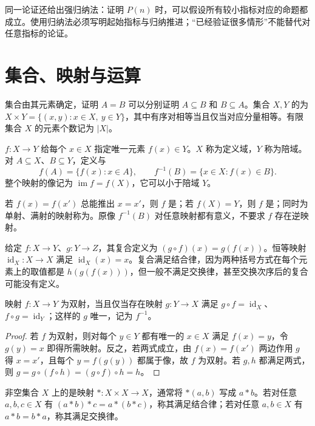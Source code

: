 \documentclass[UTF8,12pt,a4paper,fontset=fandol]{ctexbook}
\begin{document}
同一论证还给出强归纳法：证明 $P(n)$ 时，可以假设所有较小指标对应的命题都成立。使用归纳法必须写明起始指标与归纳推进；“已经验证很多情形”不能替代对任意指标的论证。

\section{集合、映射与运算}\label{sec:maps-operations}

集合由其元素确定，证明 $A=B$ 可以分别证明 $A\subseteq B$ 和 $B\subseteq A$。集合 $X,Y$ 的为 $X\times Y=\{(x,y):x\in X,\ y\in Y\}$，其中有序对相等当且仅当对应分量相等。有限集合 $X$ 的元素个数记为 $|X|$。

\begin{definition}[映射与像]
$f:X\to Y$ 给每个 $x\in X$ 指定唯一元素 $f(x)\in Y$。$X$ 称为定义域，$Y$ 称为陪域。对 $A\subseteq X$、$B\subseteq Y$，定义与
\[
  f(A)=\{f(x):x\in A\},\qquad
  f^{-1}(B)=\{x\in X:f(x)\in B\}.
\]
整个映射的像记为 $\operatorname{im}f=f(X)$，它可以小于陪域 $Y$。
\end{definition}

若 $f(x)=f(x')$ 总能推出 $x=x'$，则 $f$ 是；若 $f(X)=Y$，则 $f$ 是；同时为单射、满射的映射称为。原像 $f^{-1}(B)$ 对任意映射都有意义，不要求 $f$ 存在逆映射。

给定 $f:X\to Y$、$g:Y\to Z$，其复合定义为 $(g\circ f)(x)=g(f(x))$。恒等映射 $\operatorname{id}_X:X\to X$ 满足 $\operatorname{id}_X(x)=x$。复合满足结合律，因为两种括号方式在每个元素上的取值都是 $h(g(f(x)))$，但一般不满足交换律，甚至交换次序后的复合可能没有定义。

\begin{proposition}[双射与逆映射]\label{prop:inverse-map}
映射 $f:X\to Y$ 为双射，当且仅当存在映射 $g:Y\to X$ 满足 $g\circ f=\operatorname{id}_X$、$f\circ g=\operatorname{id}_Y$；这样的 $g$ 唯一，记为 $f^{-1}$。
\end{proposition}
\begin{proof}
若 $f$ 为双射，则对每个 $y\in Y$ 都有唯一的 $x\in X$ 满足 $f(x)=y$，令 $g(y)=x$ 即得所需映射。反之，若两式成立，由 $f(x)=f(x')$ 两边作用 $g$ 得 $x=x'$，且每个 $y=f(g(y))$ 都属于像，故 $f$ 为双射。若 $g,h$ 都满足两式，则 $g=g\circ(f\circ h)=(g\circ f)\circ h=h$。
\end{proof}

\begin{definition}[二元运算]
非空集合 $X$ 上的是映射 $*:X\times X\to X$，通常将 $*(a,b)$ 写成 $a*b$。若对任意 $a,b,c\in X$ 有 $(a*b)*c=a*(b*c)$，称其满足结合律；若对任意 $a,b\in X$ 有 $a*b=b*a$，称其满足交换律。
\end{definition}
\end{document}
